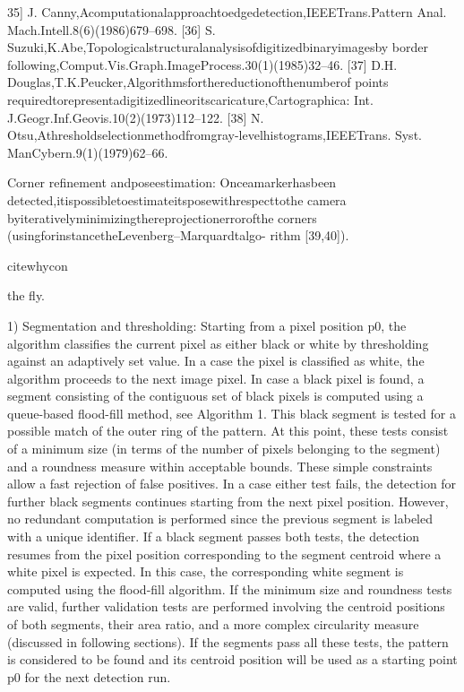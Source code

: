 \documentclass[a4paper]{report}
\begin{document}
35] J. Canny,Acomputationalapproachtoedgedetection,IEEETrans.Pattern
Anal. Mach.Intell.8(6)(1986)679–698.
[36] S. Suzuki,K.Abe,Topologicalstructuralanalysisofdigitizedbinaryimagesby
border following,Comput.Vis.Graph.ImageProcess.30(1)(1985)32–46.
[37] D.H. Douglas,T.K.Peucker,Algorithmsforthereductionofthenumberof
points requiredtorepresentadigitizedlineoritscaricature,Cartographica:
Int. J.Geogr.Inf.Geovis.10(2)(1973)112–122.
[38] N. Otsu,Athresholdselectionmethodfromgray-levelhistograms,IEEETrans.
Syst. ManCybern.9(1)(1979)62–66.

Corner refinement andposeestimation: Onceamarkerhasbeen
detected,itispossibletoestimateitsposewithrespecttothe
camera byiterativelyminimizingthereprojectionerrorofthe
corners (usingforinstancetheLevenberg–Marquardtalgo-
rithm [39,40]). 


cite{whycon}

the fly. 

 
1) Segmentation and thresholding: Starting from a pixel position p0, the algorithm classifies the current pixel as either black or white by thresholding against an adaptively set value.
In a case the pixel is classified as white, the algorithm
proceeds to the next image pixel. In case a black pixel is
found, a segment consisting of the contiguous set of black
pixels is computed using a queue-based flood-fill method, see
Algorithm 1. This black segment is tested for a possible match
of the outer ring of the pattern. At this point, these tests consist
of a minimum size (in terms of the number of pixels belonging
to the segment) and a roundness measure within acceptable
bounds. These simple constraints allow a fast rejection of false
positives. In a case either test fails, the detection for further
black segments continues starting from the next pixel position.
However, no redundant computation is performed since the
previous segment is labeled with a unique identifier.
If a black segment passes both tests, the detection resumes
from the pixel position corresponding to the segment centroid
where a white pixel is expected. In this case, the corresponding
white segment is computed using the flood-fill algorithm. If the
minimum size and roundness tests are valid, further validation
tests are performed involving the centroid positions of both
segments, their area ratio, and a more complex circularity
measure (discussed in following sections). If the segments pass
all these tests, the pattern is considered to be found and its
centroid position will be used as a starting point p0 for the
next detection run.
\end{document}
